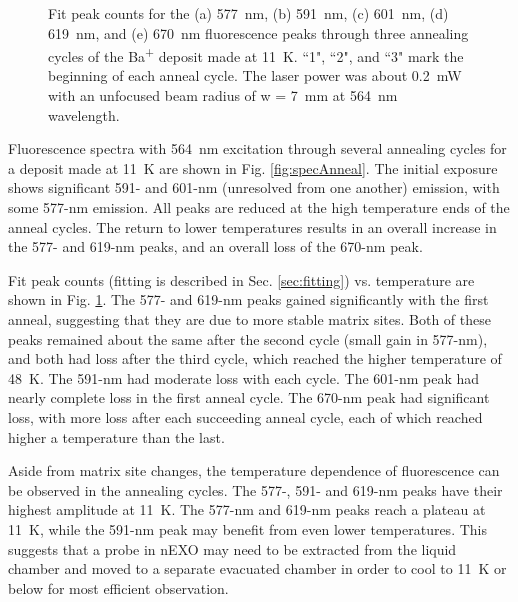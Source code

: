\begin{figure}
                \caption{Fit peak counts for the (a) 577~nm, (b) 591~nm, (c) 601~nm, (d) 619~nm, and (e) 670~nm fluorescence peaks through three annealing cycles of the Ba\textsuperscript{+} deposit made at 11~K.  ``1", ``2", and ``3" mark the beginning of each anneal cycle.  The laser power was about 0.2~mW with an unfocused beam radius of w = 7~mm at 564~nm wavelength.}
\label{fig:annealGrn}
\end{figure}

Fluorescence spectra with 564~nm excitation through several annealing cycles for a deposit made at 11~K are shown in Fig. \ref{fig:specAnneal}.  The initial exposure shows significant 591- and 601-nm (unresolved from one another) emission, with some 577-nm emission.  All peaks are reduced at the high temperature ends of the anneal cycles.  The return to lower temperatures results in an overall increase in the 577- and 619-nm peaks, and an overall loss of the 670-nm peak.  

Fit peak counts (fitting is described in Sec. \ref{sec:fitting}) vs. temperature are shown in Fig. \ref{fig:annealGrn}.  The 577- and 619-nm peaks gained significantly with the first anneal, suggesting that they are due to more stable matrix sites.  Both of these peaks remained about the same after the second cycle (small gain in 577-nm), and both had loss after the third cycle, which reached the higher temperature of 48~K.  The 591-nm had moderate loss with each cycle.  The 601-nm peak had nearly complete loss in the first anneal cycle.  The 670-nm peak had significant loss, with more loss after each succeeding anneal cycle, each of which reached higher a temperature than the last.




Aside from matrix site changes, the temperature dependence of fluorescence can be observed in the annealing cycles.  The 577-, 591- and 619-nm peaks have their highest amplitude at 11~K.  The 577-nm and 619-nm peaks reach a plateau at 11~K, while the 591-nm peak may benefit from even lower temperatures.  This suggests that a probe in nEXO may need to be extracted from the liquid chamber and moved to a separate evacuated chamber in order to cool to 11~K or below for most efficient observation.  

